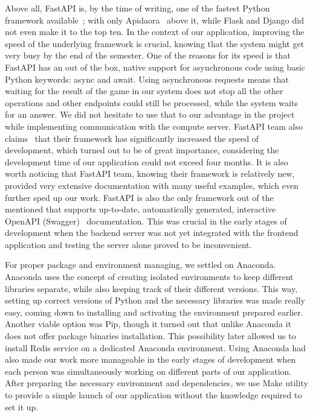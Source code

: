Above all, FastAPI is, by the time of writing, one of the fastest Python framework available~\cite{fastapi_benchmarks}; with only Apidaora~\cite{apiadora} above it, while Flask and Django did not even make it to the top ten. In the context of our application, improving the speed of the underlying framework is crucial, knowing that the system might get very busy by the end of the semester. One of the reasons for its speed is that FastAPI has an out of the box, native support for asynchronous code using basic Python keywords: async and await. Using asynchronous requests means that waiting for the result of the game in our system does not stop all the other operations and other endpoints could still be processed, while the system waits for an answer. We did not hesitate to use that to our advantage in the project while implementing communication with the compute server. FastAPI team also claims~\cite{fastapi} that their framework has significantly increased the speed of development, which turned out to be of great importance, considering the development time of our application could not exceed four months. It is also worth noticing that FastAPI team, knowing their framework is relatively new, provided very extensive documentation with many useful examples, which even further sped up our work. FastAPI is also the only framework out of the mentioned that supports up-to-date, automatically generated, interactive OpenAPI (Swagger)~\cite{Haupt2014} documentation. This was crucial in the early stages of development when the backend server was not yet integrated with the frontend application and testing the server alone proved to be inconvenient.


For proper package and environment managing, we settled on Anaconda. Anaconda uses the concept of creating isolated environments to keep different libraries separate, while also keeping track of their different versions. This way, setting up correct versions of Python and the necessary libraries was made really easy, coming down to installing and activating the environment prepared earlier. Another viable option was Pip, though it turned out that unlike Anaconda it does not offer package binaries installation. This possibility later allowed us to install Redis service on a dedicated Anaconda environment. Using Anaconda had also made our work more manageable in the early stages of development when each person was simultaneously working on different parts of our application. After preparing the necessary environment and dependencies, we use Make utility to provide a simple launch of our application without the knowledge required to set it up.

